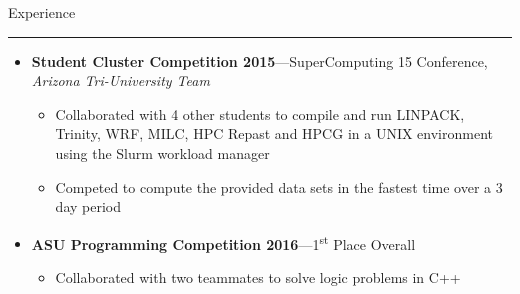 \documentclass[10pt,oneside]{article}
\newcommand{\sectitle}[1]{
	\begin{flushleft}{\fontfamily{phv}\selectfont\Large#1}\end{flushleft}
}
\newenvironment{ressection}[1]{
	\vspace{2pt}
	\sectitle{#1}
	\vspace{-10pt}\rule{\textwidth}{0.5pt}
	\vspace{-10pt}
	\begin{itemize}
	\vspace{3pt}
}{
	\end{itemize}
}
\newcommand{\ressubitem}[1]{
	\vspace{-1pt}
	\item \begin{flushleft} #1 \end{flushleft}
}
\newcommand{\resmeditem}[2]{
	\vspace{-5pt}
	\item
	\textbf{#1}---#2
}
\newcommand{\resbigitemline}[3]{
	\vspace{-5pt}
	\item
	\textbf{#1}---#2, 
	\textit{#3}
}
\newenvironment{ressubsecshort}[2]{
	\resmeditem{#1}{#2}
	\vspace{-2pt}
	\begin{itemize}
	}{
	\end{itemize}
}
\newenvironment{ressubsecline}[3]{
	\resbigitemline{#1}{#2}{#3}
	\vspace{-2pt}
	\begin{itemize}
}{
	\end{itemize}
}
\begin{document}
\begin{ressection}{Experience}
	\begin{ressubsecline}{Student Cluster Competition 2015}{SuperComputing 15 Conference}{Arizona Tri-University Team}
		\ressubitem{Collaborated with 4 other students to compile and run LINPACK, Trinity, WRF, MILC, HPC Repast and
		HPCG in a UNIX environment using the Slurm workload manager}
		\ressubitem{Competed to compute the provided data sets in the fastest time over a 3 day period}
	\end{ressubsecline}
	\begin{ressubsecshort}{ASU Programming Competition 2016}{1\textsuperscript{st} Place Overall}
		\ressubitem{Collaborated with two teammates to solve logic problems in C++}
	\end{ressubsecshort}
\end{ressection}
\end{document}
